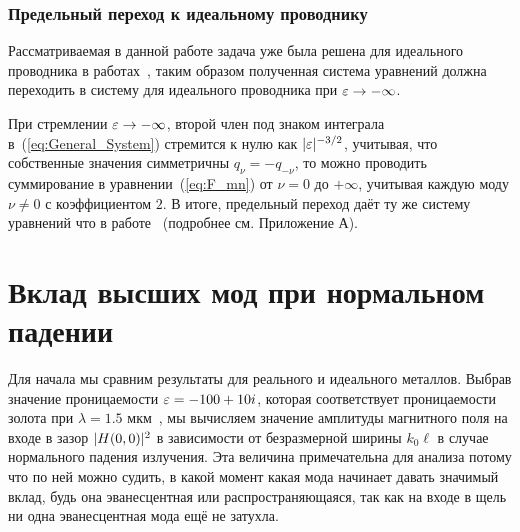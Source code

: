 \subsubsection{Предельный переход к идеальному проводнику}
Рассматриваемая в данной работе задача уже была решена для идеального проводника в работах~\cite{gorkunov2011transmission,Shapiro16}, таким образом полученная система уравнений должна переходить в систему для идеального проводника при $\varepsilon \to -\infty$. 

При стремлении $\varepsilon \to -\infty$, второй член под знаком интеграла в~(\ref{eq:General_System}) стремится к нулю как $\lvert\varepsilon\rvert^{-3/2}$, 
учитывая, что собственные значения симметричны $q_{\nu} = -q_{-\nu}$, то можно проводить суммирование в уравнении~(\ref{eq:F_mn}) 
от $\nu = 0$ до $+\infty$, учитывая каждую моду $\nu \neq 0$ с коэффициентом $2$. В итоге, предельный переход даёт ту же систему
уравнений что в работе~\cite{Shapiro16} (подробнее см. Приложение А).
\section{Вклад высших мод при нормальном падении}
Для начала мы сравним результаты для реального и идеального металлов. Выбрав значение проницаемости $\varepsilon = -100 + 10i$, которая соответствует 
проницаемости золота при $\lambda = 1.5$ мкм~\cite{johnson1972optical}, мы вычисляем значение амплитуды магнитного поля на входе в зазор $\lvert H(0,0)\rvert^2$ в зависимости от 
безразмерной ширины $k_0 \ell$ в случае нормального падения излучения. Эта величина примечательна для анализа потому что по ней можно судить, в какой момент какая мода начинает давать значимый вклад, будь она эванесцентная или распространяющаяся, так как на входе в щель ни одна эванесцентная мода ещё не затухла. 

